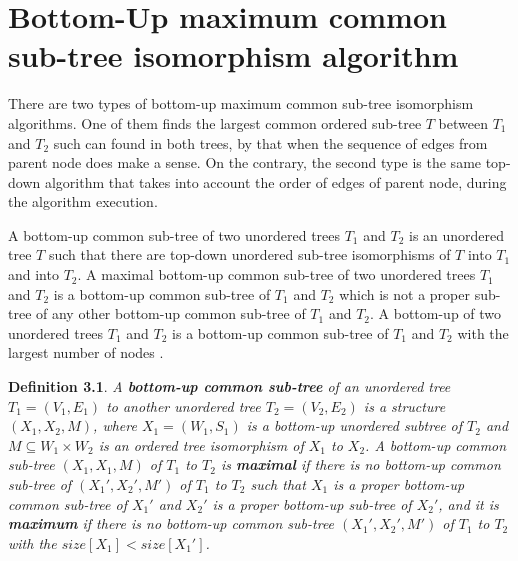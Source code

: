 \documentclass{report}
\begin{document}
\section{Bottom-Up maximum common sub-tree isomorphism algorithm }
\label{sec:bottomup}

There are two types of bottom-up maximum common sub-tree isomorphism algorithms. One of them finds the largest common ordered sub-tree $T$ between $ T_{1}$ and $ T_{2}$ such can found in both trees, by that when the sequence of edges from parent node does make a sense. On the contrary, the second type is the same top-down algorithm that takes into account the order of edges of parent node, during the algorithm execution. 

A bottom-up common sub-tree of two unordered trees $ T_{1}$ and $ T_{2 }$ is an unordered tree $T$ such that there are top-down unordered sub-tree isomorphisms of $ T$ into $ T_{1}$ and into $ T_{2}$. A maximal bottom-up common sub-tree of two unordered  trees $ T_{1}$ and $ T_{2}$ is a bottom-up common sub-tree of $ T_{1}$ and $ T_{2}$ which is not a proper sub-tree of any other bottom-up common sub-tree of $ T_{1}$ and $ T_{2}$. A bottom-up of two unordered trees $ T_{1}$ and $ T_{2}$ is a bottom-up common sub-tree of $ T_{1}$ and $ T_{2}$ with the largest number of nodes \cite{valiente}.

\textbf{Definition 3.1}. \emph{
A \textbf{bottom-up common sub-tree} of an unordered tree $ T_{1} = ( V_{1}, E_{1})$ to another unordered tree $ T_{2} = ( V_{2}, E_{2})$ is a structure 
$ (X_{1}, X_{2}, M)$, where $ X_{1} = (W_{1}, S_{1})$ is a bottom-up unordered subtree of $ T_{2}$ and $M \subseteq W_{1} \times  W_{2}$ is an ordered tree isomorphism of $ X_{1}$ to $ X_{2}$. A bottom-up common sub-tree $ (X_{1}, X_{1}, M)$ of $ T_{1}$ to $ T_{2}$ is \textbf{maximal} if there is no bottom-up common sub-tree of $ (X_{1}', X_{2}', M')$ of $ T_{1}$ to $ T_{2}$ such that $ X_{1}$  is a proper bottom-up common sub-tree of $ X_{1}'$ and $ X_{2}'$ is a proper bottom-up sub-tree of $ X_{2}'$, and it is \textbf{maximum} if there is no bottom-up common sub-tree $ (X_{1}', X_{2}', M')$  of $ T_{1}$ to $ T_{2}$ with the $size[X_{1}] < size[X_{1}']$\cite{valiente}.
}
\end{document}
